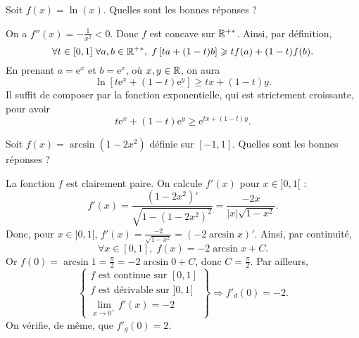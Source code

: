 \begin{question}
Soit $f(x)=\ln (x)$. Quelles sont les bonnes réponses ?
\begin{answers}  
\end{answers}
\begin{explanations}
On a $\displaystyle f''(x)=-\frac{1}{x^2}<0$. Donc $f$ est concave sur $\mathbb{R}^{+*}$. Ainsi, par définition,
$$\forall t\in [0,1]\; \forall a,b\in \mathbb{R}^{+*},\; f\left[ta+(1-t)b\right]\geqslant tf(a)+(1-t)f(b).$$
En prenant $a=\mathrm{e}^x$ et $b=\mathrm{e}^x$, où $x,y\in \mathbb{R}$, on aura
$$\ln\left[t\mathrm{e}^x+(1-t)\mathrm{e}^y\right]\geq tx+(1-t)y.$$
Il suffit de composer par la fonction exponentielle, qui est strictement croissante, pour avoir
$$t\mathrm{e}^x+(1-t)\mathrm{e}^y\geq \mathrm{e}^{tx+(1-t)y}.$$
\end{explanations}
\end{question}



\begin{question}
Soit $f(x)=\arcsin (1-2x^2)$ définie sur $[-1,1]$. Quelles sont les bonnes réponses ?
\begin{answers}  
\end{answers}
\begin{explanations}
La fonction $f$ est clairement paire. On calcule $f'(x)$ pour $x\in ]0,1[$ : 
$$f'(x)=\frac{(1-2x^2)'}{\sqrt{1-(1-2x^2)^2}}=\frac{-2x}{|x|\sqrt{1-x^2}}.$$
Donc, pour $x\in ]0,1[$, $\displaystyle f'(x)=\frac{-2}{\sqrt{1-x^2}}=(-2\arcsin x)'$. Ainsi, par continuité,
$$\forall x\in [0,1],\; f(x)=-2\arcsin x+C.$$
Or $\displaystyle f(0)=\arcsin 1=\frac{\pi}{2}=-2\arcsin 0+C$, donc $\displaystyle C=\frac{\pi}{2}$. Par ailleurs,
$$\left\{\begin{array}{l}f\mbox{ est continue sur }[0,1]\\ f\mbox{ est dérivable sur }]0,1[\\ \displaystyle \lim _{x\to 0^+}f'(x)=-2
\end{array}\right\}\Rightarrow f'_d(0)=-2.$$
On vérifie, de même, que $f'_g(0)=2$.
\end{explanations}
\end{question}

